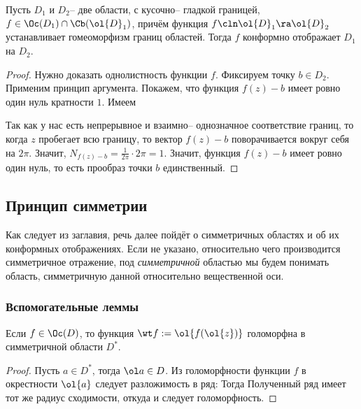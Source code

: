 \documentclass[a4paper]{article}
\begin{document}
\begin{theorem}
Пусть $D_1$ и $D_2$-- две области, с кусочно-- гладкой границей, $f\in\Oc(D_1) \cap \Cb(\ol{D}_1)$,
причём функция $f\cln \ol{D}_1\ra \ol{D}_2$ устанавливает гомеоморфизм границ областей.
Тогда $f$ конформно отображает $D_1$ на $D_2$.
\end{theorem}
\begin{proof}
Нужно доказать однолистность функции $f$. Фиксируем точку $b \in D_2$.
Применим принцип аргумента. Покажем, что функция $f(z)-b$ имеет ровно один нуль кратности $1$. Имеем


Так как у нас есть непрерывное и взаимно-- однозначное соответствие границ, то когда $z$ пробегает всю границу, то
вектор $f(z)-b$ поворачивается вокруг себя на $2\pi$. Значит, $N_{f(z)-b} = \frac{1}{2\pi} \cdot2\pi =1$.
Значит, функция $f(z)-b$ имеет ровно один нуль, то есть прообраз точки $b$ единственный.
\end{proof}

\subsection{Принцип симметрии}

Как следует из заглавия, речь далее пойдёт о симметричных областях и об их конформных отображениях.
Если не указано, относительно чего производится симметричное отражение, под \emph{симметричной}
областью мы будем понимать область, симметричную данной относительно вещественной оси.

\subsubsection{Вспомогательные леммы}

\begin{lemma}
Если $f\in\Oc(D)$, то функция $\wt f := \ol{f(\ol{z})}$ голоморфна в симметричной области $D^*$.
\end{lemma}
\begin{proof}
Пусть $a \in D^*$, тогда $\ol a \in D$. Из голоморфности функции $f$ в окрестности $\ol{a}$ следует
разложимость в ряд:
Тогда
Полученный ряд имеет тот же радиус сходимости, откуда и следует голоморфность.
\end{proof}
\end{document}
